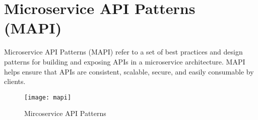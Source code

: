 \section{Microservice API Patterns (MAPI)}
Microservice API Patterns (MAPI) refer to a set of best practices and design patterns for building and exposing APIs in a microservice architecture. MAPI helps ensure that APIs are consistent, scalable, secure, and easily consumable by clients.

\begin{figure}[H]
  \center
  \texttt{[image: mapi]}
  \caption{Mircoservice API Patterns}
\end{figure}